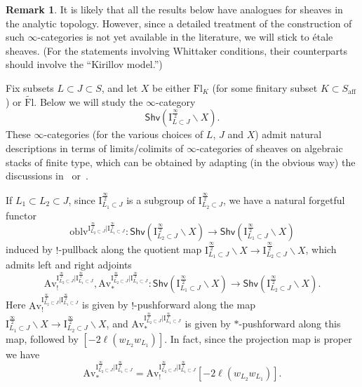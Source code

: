 \documentclass[11pt]{amsart}
\numberwithin{equation}{section}
\theoremstyle{plain}
\theoremstyle{definition}
\newtheorem{rmk}[thm]{Remark}
\newcommand{\I}{{\mathrm I}}
\renewcommand{\k}{\Bbbk}
\newcommand{\rQ}{{\mathrm Q}}
\newcommand{\Vect}{\mathsf{Vect}}
\newcommand{\semi}{{{\frac{\infty}{2}}}}
\newcommand{\quar}{{{\frac{\infty}{4}}}}
\newcommand{\oblv}{\mathrm{oblv}}
\newcommand{\Av}{\mathrm{Av}}
\newcommand{\ex}{\mathrm{ext}}
\newcommand{\af}{\mathrm{aff}}
\newcommand{\Shv}{\mathsf{Shv}}
\newcommand{\Fl}{\mathrm{Fl}}
\newcommand{\tFl}{\widetilde{\Fl}}
\begin{document}
\begin{rmk}
It is likely that all the results below have analogues for sheaves in the analytic topology. However, since a detailed treatment of the construction of such $\infty$-categories is not yet available in the literature, we will stick to \'etale sheaves. (For the statements involving Whittaker conditions, their counterparts should involve the ``Kirillov model.'')
\end{rmk}


Fix subsets $L \subset J \subset S$, and
let $X$ be either $\Fl_K$ (for some finitary subset $K \subset S_\af$) or $\tFl$. 
Below we will study the $\infty$-category 
\[
\Shv \left( \I^\semi_{L \subset J} \backslash X \right).
\]
These $\infty$-categories (for the various choices of $L$, $J$ and $X$) admit natural descriptions in terms of limits/colimits of $\infty$-cate\-gories of sheaves on algebraic stacks of finite type, which can be obtained by adapting (in the obvious way) the discussions in~\cite[\S\S 2.5--2.6]{adr} or~\cite[\S 1.2]{Gaits18}.


If $L_1 \subset L_2 \subset J$,
since $\I_{L_1 \subset J}^{\semi}$ is a subgroup of $\I_{L_2 \subset J}^{\semi}$, we
have a natural forgetful functor
\[
\oblv^{\I_{L_2 \subset J}^{\semi}|\I_{L_1 \subset J}^{\semi}}: \Shv \left( \I_{L_2 \subset J}^{\semi} \backslash X \right) \rightarrow \Shv \left( \I_{L_1 \subset J}^{\semi} \backslash X \right)
\]
induced by $!$-pullback along the quotient map $\I_{L_1 \subset J}^{\semi} \backslash X \to \I_{L_2 \subset J}^{\semi}\backslash X$,
which admits left and right adjoints 
\[
\Av_!^{\I_{L_2 \subset J}^{\semi}|\I_{L_1 \subset J}^{\semi}}, \Av_*^{\I_{L_2 \subset J}^{\semi}|\I_{L_1 \subset J}^{\semi}} : \Shv \left( \I_{L_1 \subset J}^{\semi} \backslash X \right) \rightarrow \Shv \left( \I_{L_2 \subset J}^{\semi} \backslash X \right). 
\]
Here $\Av_!^{\I_{L_2 \subset J}^{\semi}|\I_{L_1 \subset J}^{\semi}}$ is given by $!$-pushforward along the map $\I_{L_1 \subset J}^{\semi} \backslash X \to \I_{L_2 \subset J}^{\semi}\backslash X$, and $\Av_*^{\I_{L_2 \subset J}^{\semi}|\I_{L_1 \subset J}^{\semi}}$ is given by $*$-pushforward along this map, followed by $[-2\ell(w_{L_2}w_{L_1})]$. In fact, since the projection map is proper we have
\[
\Av_*^{\I_{L_2 \subset J}^{\semi}|\I_{L_1 \subset J}^{\semi}} = \Av_!^{\I_{L_2 \subset J}^{\semi}|\I_{L_1 \subset J}^{\semi}}[-2\ell(w_{L_2}w_{L_1})].
\]
\end{document}
